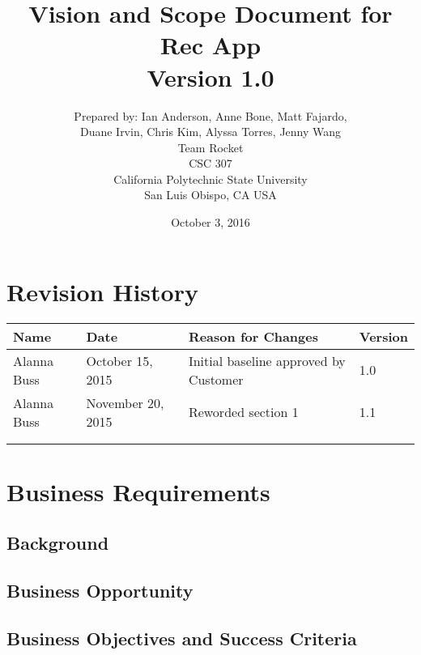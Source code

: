 \documentclass[12pt]{article}
\begin{document}
\title{Vision and Scope Document for Rec App\\Version 1.0}
\author {
Prepared by: Ian Anderson, Anne Bone, Matt Fajardo,\\
Duane Irvin, Chris Kim, Alyssa Torres, Jenny Wang\\
Team Rocket\\
CSC 307\\
California Polytechnic State University\\
San Luis Obispo, CA USA\\
}
\date{October 3, 2016}
\maketitle
\hfill
\newpage

\tableofcontents


\section*{Revision History}
\begin{tabular}{|l|l|p{2.5in}|l|}
\hline
\textbf{Name}&\textbf{Date}&\textbf{Reason for Changes}&\textbf{Version}\\
\hline
Alanna Buss&October 15, 2015&Initial baseline approved by Customer&1.0\\
\hline
Alanna Buss&November 20, 2015&Reworded section 1&1.1\\
\hline
&&&\\
\hline
&&&\\
\hline
\end{tabular}

\newpage


\section{Business Requirements}

\subsection{Background}

\subsection{Business Opportunity}

\subsection{Business Objectives and Success Criteria}
\end{document}

